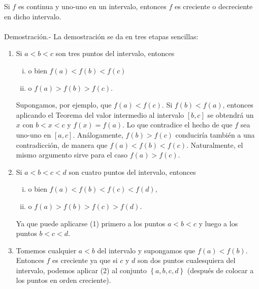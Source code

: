 \begin{teo}
    Si $f$ es continua y uno-uno en un intervalo, entonces $f$ es creciente o decreciente en dicho intervalo.\\\\
	Demostración.-\; La demostración se da en tres etapas sencillas:
	\begin{enumerate}[(1)]
	    \item Si $a<b<c$ son tres puntos del intervalo, entonces
		\begin{enumerate}[(i)]
		    \item o bien $f(a)<f(b)<f(c)$
		    \item o $f(a)>f(b)>f(c)$.
		\end{enumerate}
		Supongamos, por ejemplo, que $f(a)<f(c)$. Si $f(b)<f(a)$, entonces aplicando el Teorema del valor intermedio al intervalo $[b,c]$ se obtendrá un $x$ con $b<x<c$ y $f(x)=f(a)$. Lo que contradice el hecho de que $f$ sea uno-uno en $[a,c]$. Análogamente, $f(b)>f(c)$ conduciría también a una contradicción, de manera que $f(a)<f(b)<f(c)$. Naturalmente, el mismo argumento sirve para el caso $f(a)>f(c).$
	    \item Si $a<b<c<d$ son cuatro puntos del intervalo, entonces
		\begin{enumerate}[(i)]
		    \item o bien $f(a)<f(b)<f(c)<f(d),$
		    \item o $f(a)>f(b)>f(c)>f(d)$.
		\end{enumerate}
		Ya que puede aplicarse (1) primero a los puntos $a<b<c$ y luego a los puntos $b<c<d.$
	    \item Tomemos cualquier $a<b$ del intervalo y supongamos que $f(a)<f(b)$. Entonces $f$ es creciente ya que si $c$ y $d$ son dos puntos cualesquiera del intervalo, podemos aplicar (2) al conjunto $\left\{a,b,c,d\right\}$ (después de colocar a los puntos en orden creciente).
	\end{enumerate}
\end{teo}
